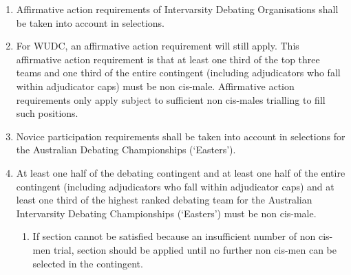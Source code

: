 \begin{enumerate}
\item Affirmative action requirements of Intervarsity Debating Organisations shall be taken into account in selections.

\item For WUDC, an affirmative action requirement will still apply. This affirmative action requirement is that at least one third of the top three teams and one third of the entire contingent (including adjudicators who fall within adjudicator caps) must be non cis-male. Affirmative action requirements only apply subject to sufficient non cis-males trialling to fill such positions.

\item Novice participation requirements shall be taken into account in selections for the Australian Debating Championships (‘Easters’).

\item At least one half of the debating contingent and at least one half of the entire contingent (including adjudicators who fall within adjudicator caps) and at least one third of the highest ranked debating team for the Australian Intervarsity Debating Championships (‘Easters’) must be non cis-male. \label{easters_ncm_aa}
  \begin{enumerate}
  \item If section  cannot be satisfied because an insufficient number of non cis-men trial, section  should be applied until no further non cis-men can be selected in the contingent.
  \end{enumerate}
\end{enumerate}
